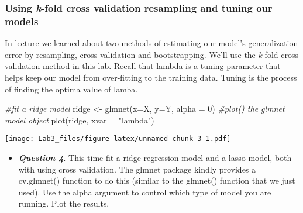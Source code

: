 \documentclass[
]{article}
\newenvironment{Shaded}{\begin{snugshade}}{\end{snugshade}}
\newcommand{\AttributeTok}[1]{\textcolor[rgb]{0.77,0.63,0.00}{#1}}
\newcommand{\CommentTok}[1]{\textcolor[rgb]{0.56,0.35,0.01}{\textit{#1}}}
\newcommand{\DecValTok}[1]{\textcolor[rgb]{0.00,0.00,0.81}{#1}}
\newcommand{\FunctionTok}[1]{\textcolor[rgb]{0.00,0.00,0.00}{#1}}
\newcommand{\NormalTok}[1]{#1}
\newcommand{\OtherTok}[1]{\textcolor[rgb]{0.56,0.35,0.01}{#1}}
\newcommand{\StringTok}[1]{\textcolor[rgb]{0.31,0.60,0.02}{#1}}
\providecommand{\tightlist}{%
  \setlength{\itemsep}{0pt}\setlength{\parskip}{0pt}}
\begin{document}
\hypertarget{using-k-fold-cross-validation-resampling-and-tuning-our-models}{%
\subsubsection{\texorpdfstring{Using \emph{k}-fold cross validation
resampling and tuning our
models}{Using k-fold cross validation resampling and tuning our models}}\label{using-k-fold-cross-validation-resampling-and-tuning-our-models}}

In lecture we learned about two methods of estimating our model's
generalization error by resampling, cross validation and bootstrapping.
We'll use the \emph{k}-fold cross validation method in this lab. Recall
that lambda is a tuning parameter that helps keep our model from
over-fitting to the training data. Tuning is the process of finding the
optima value of lamba.

\begin{Shaded}
\begin{Highlighting}[]
\CommentTok{\#fit a ridge model}
\NormalTok{ridge }\OtherTok{\textless{}{-}} \FunctionTok{glmnet}\NormalTok{(}\AttributeTok{x=}\NormalTok{X,}
                \AttributeTok{y=}\NormalTok{Y,}
                \AttributeTok{alpha =} \DecValTok{0}\NormalTok{)}
\CommentTok{\#plot() the glmnet model object}
\FunctionTok{plot}\NormalTok{(ridge, }\AttributeTok{xvar =} \StringTok{"lambda"}\NormalTok{)}
\end{Highlighting}
\end{Shaded}

\texttt{[image: Lab3\_files/figure-latex/unnamed-chunk-3-1.pdf]}

\begin{itemize}
\tightlist
\item
  \textbf{\emph{Question 4}}. This time fit a ridge regression model and
  a lasso model, both with using cross validation. The glmnet package
  kindly provides a cv.glmnet() function to do this (similar to the
  glmnet() function that we just used). Use the alpha argument to
  control which type of model you are running. Plot the results.
\end{itemize}
\end{document}
